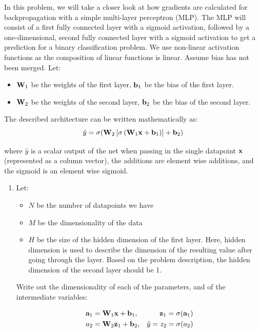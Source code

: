 \documentclass[submit]{harvardml}
\begin{document}
\begin{problem}

In this problem, we will take a closer look at how gradients are calculated for backpropagation with a simple multi-layer perceptron (MLP). The MLP will consist of a first fully connected layer with a sigmoid activation, followed by a one-dimensional, second fully connected layer with a sigmoid activation to get a prediction for a binary classification problem. We use non-linear activation functions as the composition of linear functions is linear. Assume bias has not been merged. Let:
\begin{itemize}
  \item $\bold{W}_1$ be the weights of the first layer, $\bold{b}_1$ be the bias of the first layer.
  \item $\bold{W}_2$ be the weights of the second layer, $\bold{b}_2$ be the bias of the second layer.
\end{itemize}

The described architecture can be written mathematically as: $$\hat{y} = \sigma(\bold{W}_2 \left[\sigma \left(\bold{W}_1 \bold{x} + \bold{b}_1\right)\right] + \bold{b}_2)$$

where $\hat{y}$ is a scalar output of the net when passing in the single datapoint $\bold{x}$ (represented as a column vector), the additions are element wise additions, and the sigmoid is an element wise sigmoid.

\begin{enumerate}
  \item Let:
        \begin{itemize}
          \item $N$ be the number of datapoints we have
          \item $M$ be the dimensionality of the data
          \item $H$ be the size of the hidden dimension of the first layer. Here, hidden dimension is used to describe the dimension of the resulting value after going through the layer. Based on the problem description, the hidden dimension of the second layer should be 1.
        \end{itemize}

        Write out the dimensionality of each of the parameters, and of the intermediate variables:

        \begin{align*}
          \bold{a}_1 & = \bold{W}_1 \bold{x} + \bold{b}_1,
                     & \bold{z}_1 = \sigma(\bold{a}_1)       \\
          a_2        & = \bold{W}_2 \bold{z}_1 + \bold{b}_2,
                     & \hat{y} = z_2 = \sigma(a_2)
        \end{align*}


\end{enumerate}
\end{problem}
\end{document}
